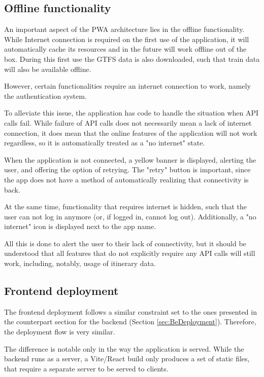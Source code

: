 \subsection{Offline functionality}
An important aspect of the PWA architecture lies in the offline functionality. While Internet connection is required on the first use of the application, it will automatically cache its resources and in the future will work offline out of the box. During this first use the GTFS data is also downloaded, such that train data will also be available offline.

However, certain functionalities require an internet connection to work, namely the authentication system.

To alleviate this issue, the application has code to handle the situation when API calls fail. While failure of API calls does not necessarily mean a lack of internet connection, it does mean that the online features of the application will not work regardless, so it is automatically treated as a "no internet" state.

When the application is not connected, a yellow banner is displayed, alerting the user, and offering the option of retrying. The "retry" button is important, since the app does not have a method of automatically realizing that connectivity is back.

At the same time, functionality that requires internet is hidden, such that the user can not log in anymore (or, if logged in, cannot log out). Additionally, a "no internet" icon is displayed next to the app name.

All this is done to alert the user to their lack of connectivity, but it should be understood that all features that do not explicitly require any API calls will still work, including, notably, usage of itinerary data.

\subsection{Frontend deployment}
The frontend deployment follows a similar constraint set to the ones presented in the counterpart section for the backend (Section \ref{sec:BeDeployment}). Therefore, the deployment flow is very similar.

The difference is notable only in the way the application is served. While the backend runs as a server, a Vite/React build only produces a set of static files, that require a separate server to be served to clients.

